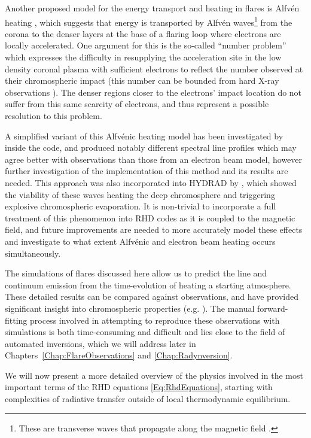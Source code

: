 Another proposed model for the energy transport and heating in flares is Alfvén heating \citep{Emslie1982, Fletcher2007}, which suggests that energy is transported by Alfvén waves\footnote{These  are transverse waves that propagate along the magnetic field \citep{TandbergHanssen1988}.} from the corona to the denser layers at the base of a flaring loop where electrons are locally accelerated.
One argument for this is the so-called ``number problem'' which expresses the difficulty in resupplying the acceleration site in the low density coronal plasma with sufficient electrons to reflect the number observed at their chromospheric impact (this number can be bounded from hard X-ray observations \citep[e.g.][]{Simoes2013}).
The denser regions closer to the electrons' impact location do not suffer from this same scarcity of electrons, and thus represent a possible resolution to this problem.

A simplified variant of this Alfvénic heating model has been investigated by \citet{Kerr2016} inside the \Radyn{} code, and produced notably different spectral line profiles which may agree better with observations than those from an electron beam model, however further investigation of the implementation of this method and its results are needed.
This approach was also incorporated into HYDRAD by \citet{Reep2016}, which showed the viability of these waves heating the deep chromosphere and triggering explosive chromospheric evaporation.
It is non-trivial to incorporate a full treatment of this phenomenon into RHD codes as it is coupled to the magnetic field, and future improvements are needed to more accurately model these effects and investigate to what extent Alfvénic and electron beam heating occurs simultaneously.

The simulations of flares discussed here allow us to predict the line and continuum emission from the time-evolution of heating a starting atmosphere.
These detailed results can be compared against observations, and have provided significant insight into chromospheric properties (e.g. \citet{Kuridze2015,RubioDaCosta2016,Kowalski2017,Simoes2017}).
The manual forward-fitting process involved in attempting to reproduce these observations with simulations is both time-consuming and difficult and lies close to the field of automated inversions, which we will address later in Chapters~\ref{Chap:FlareObservations} and \ref{Chap:Radynversion}.

We will now present a more detailed overview of the physics involved in the most important terms of the RHD equations \eqref{Eq:RhdEquations}, starting with complexities of radiative transfer outside of local thermodynamic equilibrium.

